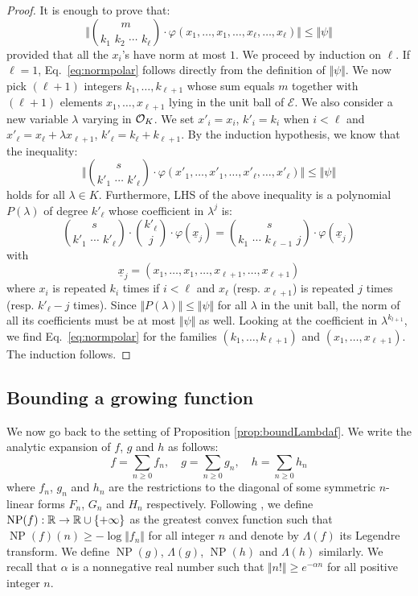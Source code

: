 \documentclass{sig-alternate}
\DeclareMathOperator{\NP}{NP}
\begin{document}
\begin{proof}
It is enough to prove that:
\begin{equation}
\label{eq:normpolar}
\Big\Vert \binom m {k_1 \,\, k_2 \,\, \cdots \,\, k_\ell} \cdot
\varphi(x_1, \ldots, x_1, \ldots, x_\ell, \ldots,
x_\ell) \Big\Vert \leq \Vert \psi \Vert
\end{equation}
provided that all the $x_i$'s have norm at most $1$. We proceed by 
induction on 
$\ell$. If $\ell = 1$, Eq.~\eqref{eq:normpolar} follows directly from
the definition of $\Vert \psi \Vert$. 
We now pick $(\ell+1)$ integers $k_1, \ldots, k_{\ell+1}$ whose sum 
equals $m$ together with $(\ell+1)$ elements $x_1, \ldots, x_{\ell+1}$
lying in the unit ball of $\mathcal E$.
We also consider a new variable $\lambda$ varying in
$\mathcal O_K$. We set $x'_i = x_i$, $k'_i = k_i$ when $i < \ell$ and $x'_\ell 
= x_\ell + \lambda x_{\ell+1}$, $k'_\ell = k_\ell + k_{\ell+1}$. By the 
induction hypothesis, we know that the inequality:
$$\Big\Vert \binom s {k'_1 \,\, \cdots \,\, k'_\ell} \cdot
\varphi(x'_1, \ldots, x'_1, \ldots, x'_\ell, \ldots, x'_\ell) \Big\Vert
\leq \Vert \psi \Vert$$
holds for all $\lambda \in K$. Furthermore, LHS of the above inequality
is a polynomial $P(\lambda)$ of degree $k'_\ell$ whose coefficient in 
$\lambda^j$ is:
$$\binom s {k'_1 \,\, \cdots \,\, k'_\ell} \cdot
\binom {k'_\ell} {j} \cdot
\varphi(\underline x_j) = 
\binom s {k_1 \,\, \cdots \,\, k_{\ell-1} \,\, j} \cdot
\varphi(\underline x_j)$$
with
$$\underline x_j = (x_1, \ldots, x_1, \ldots, x_{\ell+1}, \ldots, 
x_{\ell+1})$$
where $x_i$ is repeated $k_i$ times if $i < \ell$ and $x_\ell$ 
(resp. $x_{\ell+1}$) is repeated $j$ times (resp. $k'_\ell - j$ times).
Since $\Vert P(\lambda) \Vert \leq \Vert \psi \Vert$ for all $\lambda$ in 
the unit ball, the norm of all its coefficients must be at most $\Vert \psi
\Vert$ as well. Looking at the coefficient in $\lambda^{k_{l+1}}$, we find
Eq.~\eqref{eq:normpolar} for the families $(k_1, \ldots, k_{\ell+1})$ 
and $(x_1, \ldots, x_{\ell+1})$. The induction follows.
\end{proof}

\subsection{Bounding a growing function}

We now go back to the setting of Proposition \ref{prop:boundLambdaf}.
We write the analytic expansion of $f$, $g$ and $h$ as follows: 
$$f = \sum_{n \geq 0} f_n, \quad
g = \sum_{n \geq 0} g_n, \quad
h = \sum_{n \geq 0} h_n$$
where $f_n$, $g_n$ and $h_n$ are the restrictions to the diagonal of 
some symmetric $n$-linear forms $F_n$, $G_n$ and $H_n$ respectively.
Following \cite{caruso-roe-vaccon:14a}, we define $\NP(f) : \R \to \R \cup 
\{+\infty\}$ as the greatest convex function such that $\NP(f)(n) \geq - 
\log \Vert f_n \Vert$ for all integer $n$ and denote by $\Lambda(f)$ its 
Legendre transform. We define $\NP(g)$, $\Lambda(g)$, $\NP(h)$ and
$\Lambda(h)$ similarly.
We recall that $\alpha$ is a nonnegative real number such that $\Vert n! 
\Vert \geq e^{-\alpha n}$ for all positive integer $n$.
\end{document}
